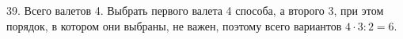 39. Всего валетов 4. Выбрать первого валета 4 способа, а второго 3, при этом порядок, в котором они выбраны, не важен, поэтому всего вариантов $4\cdot3:2=6.$\\
